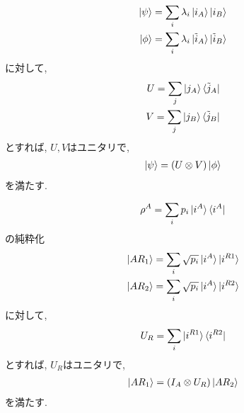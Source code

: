 \begin{ex}
    \label{ex2.80}
    \begin{align*}
        \ket{\psi} = \sum_i \lambda_i \ket{i_A}\ket{i_B}                  \\
        \ket{\phi} = \sum_i \lambda_i \ket{\tilde{i}_A} \ket{\tilde{i}_B} \\
    \end{align*}
    に対して,
    \begin{align*}
        U = \sum_j \ket{j_A} \bra{\tilde{j}_A} \\
        V= \sum_j \ket{j_B} \bra{\tilde{j}_B}  \\
    \end{align*}
    とすれば, $U,V$はユニタリで,
    \begin{align*}
        \ket{\psi} = (U \otimes V)\ket{\phi}
    \end{align*}
    を満たす.
\end{ex}

\begin{ex}
    \label{ex2.81}
    \begin{align*}
        \rho^A = \sum_i p_i \ket{i^A} \bra{i^A}
    \end{align*}
    の純粋化
    \begin{align*}
        \ket{AR_1} = \sum_i \sqrt{p_i} \ket{i^A} \ket{i^{R1}} \\
        \ket{AR_2} = \sum_i \sqrt{p_i} \ket{i^A} \ket{i^{R2}}
    \end{align*}
    に対して,
    \begin{align*}
        U_R = \sum_i \ket{i^{R1}} \bra{i^{R2}}
    \end{align*}
    とすれば, $U_R$はユニタリで,
    \begin{align*}
        \ket{A R_1} = (I_A \otimes U_R) \ket{A R_2}
    \end{align*}
    を満たす.
\end{ex}

